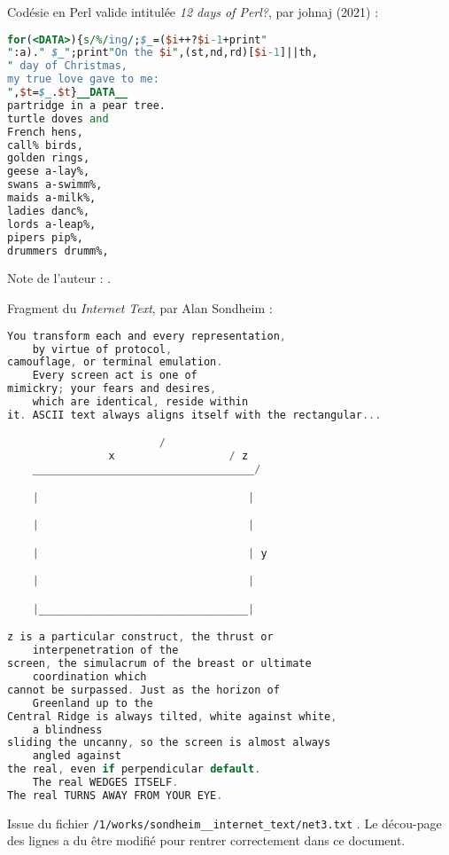 \documentclass[12pt]{article} %
\begin{document}
\newpage
Codésie en Perl valide intitulée \textit{12 days of Perl?}, par johnaj (2021) :
\begin{lstlisting}[language=Perl, caption={}, label={codework:12daysPerl}]
for(<DATA>){s/%/ing/;$_=($i++?$i-1+print"
":a)." $_";print"On the $i",(st,nd,rd)[$i-1]||th,
" day of Christmas,
my true love gave to me:
",$t=$_.$t}__DATA__
partridge in a pear tree.
turtle doves and
French hens,
call% birds,
golden rings,
geese a-lay%,
swans a-swimm%,
maids a-milk%,
ladies danc%,
lords a-leap%,
pipers pip%,
drummers drumm%,
\end{lstlisting}
Note de l'auteur :  \cite{codework-12DaysOfPerl}.

\newpage
Fragment du \textit{Internet Text}, par Alan Sondheim :
\begin{lstlisting}[language=C, caption={Internet Text, fragment de net3.txt}, label={codework:internet-text}]
You transform each and every representation, 
    by virtue of protocol,
camouflage, or terminal emulation. 
    Every screen act is one of
mimickry; your fears and desires, 
    which are identical, reside within
it. ASCII text always aligns itself with the rectangular...

                        /
                x                  / z
    ___________________________________/

    |                                 |

    |                                 |

    |                                 | y

    |                                 |

    |_________________________________|

z is a particular construct, the thrust or 
    interpenetration of the
screen, the simulacrum of the breast or ultimate
    coordination which
cannot be surpassed. Just as the horizon of 
    Greenland up to the
Central Ridge is always tilted, white against white, 
    a blindness
sliding the uncanny, so the screen is almost always 
    angled against
the real, even if perpendicular default. 
    The real WEDGES ITSELF.
The real TURNS AWAY FROM YOUR EYE.
\end{lstlisting}
Issue du fichier \verb|/1/works/sondheim__internet_text/net3.txt| \cite{ASondheim-net3}. Le décou-page des lignes a du être modifié pour rentrer correctement dans ce document.
\end{document}
